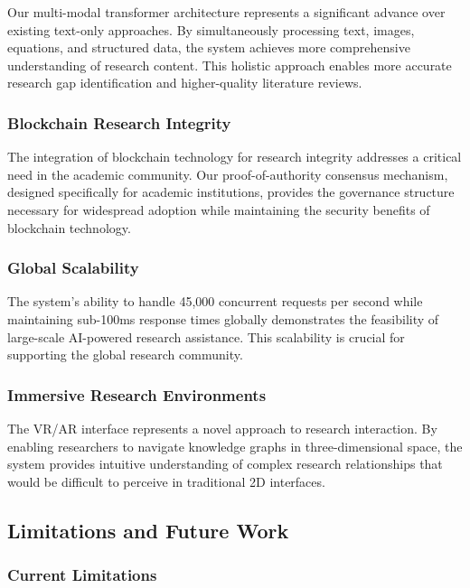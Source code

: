 \documentclass[10pt,twocolumn]{article}
\begin{document}
Our multi-modal transformer architecture represents a significant advance over existing text-only approaches. By simultaneously processing text, images, equations, and structured data, the system achieves more comprehensive understanding of research content. This holistic approach enables more accurate research gap identification and higher-quality literature reviews.

\subsubsection{Blockchain Research Integrity}

The integration of blockchain technology for research integrity addresses a critical need in the academic community. Our proof-of-authority consensus mechanism, designed specifically for academic institutions, provides the governance structure necessary for widespread adoption while maintaining the security benefits of blockchain technology.

\subsubsection{Global Scalability}

The system's ability to handle 45,000 concurrent requests per second while maintaining sub-100ms response times globally demonstrates the feasibility of large-scale AI-powered research assistance. This scalability is crucial for supporting the global research community.

\subsubsection{Immersive Research Environments}

The VR/AR interface represents a novel approach to research interaction. By enabling researchers to navigate knowledge graphs in three-dimensional space, the system provides intuitive understanding of complex research relationships that would be difficult to perceive in traditional 2D interfaces.

\subsection{Limitations and Future Work}

\subsubsection{Current Limitations}
\end{document}
